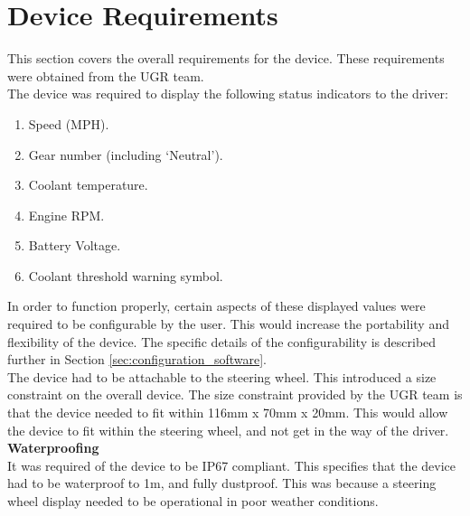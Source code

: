 \documentclass[a4paper,12pt]{article}
\begin{document}



\newpage
\section{Device Requirements}
\label{sec:device_requirements}

This section covers the overall requirements for the device. These requirements were obtained from the UGR team. \\

The device was required to display the following status indicators to the driver:

\begin{enumerate}
  \item Speed (MPH).
  \item Gear number (including `Neutral').
  \item Coolant temperature.
  \item Engine RPM.
  \item Battery Voltage.
  \item Coolant threshold warning symbol.
\end{enumerate}

In order to function properly, certain aspects of these displayed values were required to be configurable by the user. This would increase the portability and flexibility of the device. The specific details of the configurability is described further in Section \ref{sec:configuration_software}. \\

The device had to be attachable to the steering wheel. This introduced a size constraint on the overall device. The size constraint provided by the UGR team is that the device needed to fit within 116mm x 70mm x 20mm. This would allow the device to fit within the steering wheel, and not get in the way of the driver. \\

\textbf{Waterproofing} \\

It was required of the device to be IP67 compliant. This specifies that the device had to be waterproof to 1m, and fully dustproof. This was because a steering wheel display needed to be operational in poor weather conditions. \\
\end{document}
